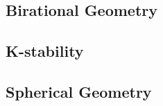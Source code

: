 \newcommand{\id}{\textrm{id}}
\newcommand{\stsh}{\mathcal{O}}
\renewcommand{\div}{\mathrm{div}}
\newcommand{\vol}{\mathrm{vol}}

\newcommand{\Div}{\mathrm{Div}}
\newcommand{\CDiv}{\mathrm{CDiv}}

\newcommand{\ord}{\mathrm{ord}}

\newcommand{\bc}{\mathrm{bar}}

\newcommand{\Pic}{\mathrm{Pic}}



\subsection{Birational Geometry}\label{sec:prelim:bir}


\subsection{K-stability}\label{sec:prelim:kstab}


\subsection{Spherical Geometry}\label{sec:prelim:sph}

